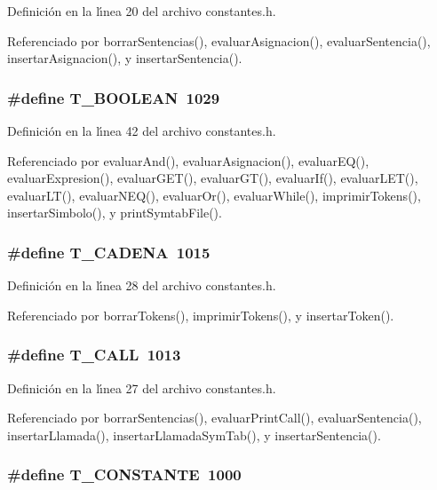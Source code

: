 Definici\'{o}n en la l\'{\i}nea 20 del archivo constantes.h.

Referenciado por borrar\-Sentencias(), evaluar\-Asignacion(), evaluar\-Sentencia(), insertar\-Asignacion(), y insertar\-Sentencia().
\subsubsection{\setlength{\rightskip}{0pt plus 5cm}\#define T\_\-BOOLEAN~1029}\label{constantes_8h_a31}




Definici\'{o}n en la l\'{\i}nea 42 del archivo constantes.h.

Referenciado por evaluar\-And(), evaluar\-Asignacion(), evaluar\-EQ(), evaluar\-Expresion(), evaluar\-GET(), evaluar\-GT(), evaluar\-If(), evaluar\-LET(), evaluar\-LT(), evaluar\-NEQ(), evaluar\-Or(), evaluar\-While(), imprimir\-Tokens(), insertar\-Simbolo(), y print\-Symtab\-File().
\subsubsection{\setlength{\rightskip}{0pt plus 5cm}\#define T\_\-CADENA~1015}\label{constantes_8h_a17}




Definici\'{o}n en la l\'{\i}nea 28 del archivo constantes.h.

Referenciado por borrar\-Tokens(), imprimir\-Tokens(), y insertar\-Token().
\subsubsection{\setlength{\rightskip}{0pt plus 5cm}\#define T\_\-CALL~1013}\label{constantes_8h_a16}




Definici\'{o}n en la l\'{\i}nea 27 del archivo constantes.h.

Referenciado por borrar\-Sentencias(), evaluar\-Print\-Call(), evaluar\-Sentencia(), insertar\-Llamada(), insertar\-Llamada\-Sym\-Tab(), y insertar\-Sentencia().
\subsubsection{\setlength{\rightskip}{0pt plus 5cm}\#define T\_\-CONSTANTE~1000}\label{constantes_8h_a3}




